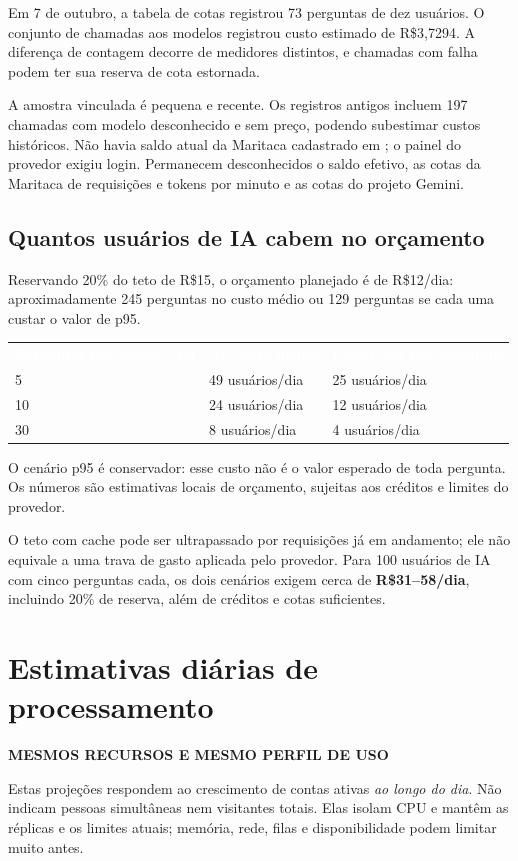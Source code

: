 \documentclass[10pt,a4paper]{article}
\newcommand{\code}[1]{{\ttfamily\footnotesize\detokenize{#1}}}
\newcommand{\smallnote}[1]{\par{\footnotesize\color{NFMuted}#1\par}}
\newcommand{\headcell}[1]{\textcolor{white}{\bfseries #1}}
\newcommand{\pagechapter}[1]{\clearpage\section{#1}}
\newcommand{\tagline}[1]{{\footnotesize\bfseries\color{NFPrimary}#1\par}\vspace{3mm}}
\begin{document}
Em 7 de outubro, a tabela de cotas registrou 73 perguntas de dez usuários. O conjunto de chamadas aos modelos registrou custo estimado de R\$3,7294. A diferença de contagem decorre de medidores distintos, e chamadas com falha podem ter sua reserva de cota estornada.

A amostra vinculada é pequena e recente. Os registros antigos incluem 197 chamadas com modelo desconhecido e sem preço, podendo subestimar custos históricos. Não havia saldo atual da Maritaca cadastrado em \code{ai_saldo_registros}; o painel do provedor exigiu login. Permanecem desconhecidos o saldo efetivo, as cotas da Maritaca de requisições e tokens por minuto e as cotas do projeto Gemini.

\subsection{Quantos usuários de IA cabem no orçamento}
Reservando 20\% do teto de R\$15, o orçamento planejado é de R\$12/dia: aproximadamente 245 perguntas no custo médio ou 129 perguntas se cada uma custar o valor de p95.
\begingroup\small\renewcommand{\arraystretch}{1.3}
\par\noindent\begin{tabularx}{\linewidth}{@{}Y R{44mm}R{47mm}@{}}
\headcell{Perguntas por pessoa/dia}&\headcell{Ao custo médio}&\headcell{Custo p95 por pergunta}\\
5&49 usuários/dia&25 usuários/dia\\
10&24 usuários/dia&12 usuários/dia\\
30&8 usuários/dia&4 usuários/dia\\
\end{tabularx}\endgroup
\smallnote{O cenário p95 é conservador: esse custo não é o valor esperado de toda pergunta. Os números são estimativas locais de orçamento, sujeitas aos créditos e limites do provedor.}

O teto com cache pode ser ultrapassado por requisições já em andamento; ele não equivale a uma trava de gasto aplicada pelo provedor. Para 100 usuários de IA com cinco perguntas cada, os dois cenários exigem cerca de \textbf{R\$31–58/dia}, incluindo 20\% de reserva, além de créditos e cotas suficientes.

\pagechapter{Estimativas diárias de processamento}
\tagline{MESMOS RECURSOS E MESMO PERFIL DE USO}
Estas projeções respondem ao crescimento de contas ativas \emph{ao longo do dia}. Não indicam pessoas simultâneas nem visitantes totais. Elas isolam CPU e mantêm as réplicas e os limites atuais; memória, rede, filas e disponibilidade podem limitar muito antes.
\end{document}
